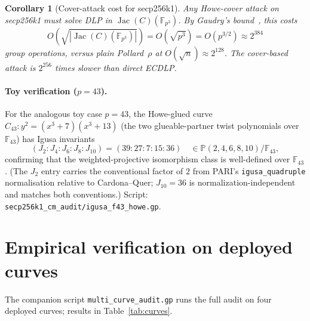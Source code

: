 \documentclass[11pt,a4paper]{article}
\newtheorem{corollary}[theorem]{Corollary}
\theoremstyle{definition}
\newcommand{\FF}{\mathbb{F}}
\newcommand{\Jac}{\operatorname{Jac}}
\begin{document}
\begin{corollary}[Cover-attack cost for secp256k1]\label{cor:fp3cost}
Any Howe-cover attack on secp256k1 must solve DLP in
$\Jac(C)(\FF_{p^3})$.  By Gaudry's bound~\cite{gaudry2000}, this costs
\[
  O\!\left(\sqrt{|\Jac(C)(\FF_{p^3})|}\right)
  = O\!\left(\sqrt{p^3}\right)
  = O\!\left(p^{3/2}\right)
  \approx 2^{384}
\]
group operations, versus plain Pollard~$\rho$ at
$O(\sqrt{n}) \approx 2^{128}$.
The cover-based attack is $2^{256}$ times \emph{slower} than direct ECDLP.
\end{corollary}

\paragraph{Toy verification ($p = 43$).}
For the analogous toy case $p = 43$, the Howe-glued curve
$C_{43}\colon y^2 = (x^3 + 7)(x^3 + 13)$ (the two glueable-partner
twist polynomials over $\FF_{43}$) has Igusa invariants
\[
  (J_2 : J_4 : J_6 : J_8 : J_{10}) = (39 : 27 : 7 : 15 : 36)
  \quad \in \mathbb{P}(2,4,6,8,10)/\FF_{43},
\]
confirming that the weighted-projective isomorphism class is
well-defined over $\FF_{43}$.  (The $J_2$ entry carries the
conventional factor of $2$ from PARI's \texttt{igusa\_quadruple}
normalisation relative to Cardona--Quer; $J_{10} = 36$ is
normalization-independent and matches both conventions.)
Script: \texttt{secp256k1\_cm\_audit/igusa\_f43\_howe.gp}.

\section{Empirical verification on deployed curves}\label{sec:empirical}

The companion script \texttt{multi\_curve\_audit.gp} runs the full
audit on four deployed curves; results in Table~\ref{tab:curves}.
\end{document}
